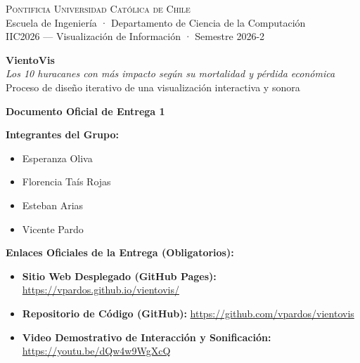 \documentclass[11pt,a4paper]{article}
\begin{document}
	
	\begin{center}
		{\scshape\Large Pontificia Universidad Católica de Chile}\\[0.2cm]
		{\large Escuela de Ingeniería · Departamento de Ciencia de la Computación}\\[0.15cm]
		{\large IIC2026 — Visualización de Información · Semestre 2026-2}\\[0.8cm]
		
		\begin{tcolorbox}[colback=ink, colframe=ink, arc=6pt, halign=center, left=15pt, right=15pt, top=14pt, bottom=14pt]
			{\color{white}\Huge \textbf{VientoVis}}\\[0.25cm]
			{\color{ochre}\LARGE \textit{Los 10 huracanes con más impacto según su mortalidad y pérdida económica}}\\[0.2cm]
			{\color{softgray}\large Proceso de diseño iterativo de una visualización interactiva y sonora}
		\end{tcolorbox}
		\vspace{0.4cm}
		
		{\large \textbf{Documento Oficial de Entrega 1}}\\[0.4cm]
		
		\begin{metabox}
			\textbf{Integrantes del Grupo:}
			\begin{itemize}[leftmargin=1.2em]
				\item Esperanza Oliva
				\item Florencia Taís Rojas
				\item Esteban Arias
				\item Vicente Pardo
			\end{itemize}
			\vspace{0.25cm}
			\textbf{Enlaces Oficiales de la Entrega (Obligatorios):}
			\begin{itemize}[leftmargin=1.2em]
				\item \textbf{Sitio Web Desplegado (GitHub Pages):} \href{https://vpardos.github.io/vientovis/}{https://vpardos.github.io/vientovis/}
				\item \textbf{Repositorio de Código (GitHub):} \href{https://github.com/vpardos/vientovis}{https://github.com/vpardos/vientovis}
				\item \textbf{Video Demostrativo de Interacción y Sonificación:} \href{https://youtu.be/dQw4w9WgXcQ}{https://youtu.be/dQw4w9WgXcQ}
			\end{itemize}
		\end{metabox}
	\end{center}
	
\end{document}
